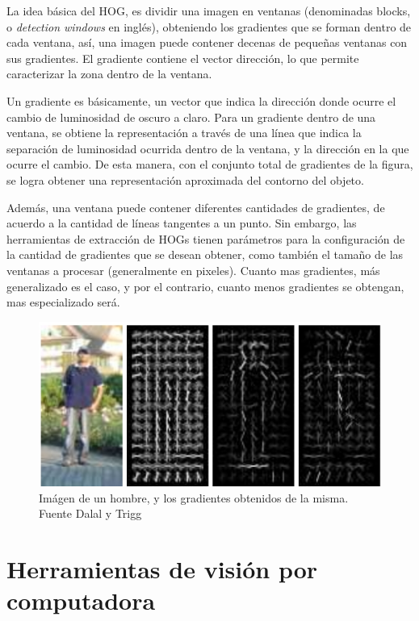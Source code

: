 \documentclass[a4paper,12pt,oneside,spanish]{book}
\begin{document}
La idea básica del HOG, es dividir una imagen en ventanas (denominadas blocks, o \textit{detection windows} en inglés), obteniendo los gradientes que se forman dentro de cada ventana, así, una imagen puede contener decenas de pequeñas ventanas con sus gradientes. El gradiente contiene el vector dirección, lo que permite caracterizar la zona dentro de la ventana.\par

Un gradiente es básicamente, un vector que indica la dirección donde ocurre el cambio de luminosidad de oscuro a claro. Para un gradiente dentro de una ventana, se obtiene la representación a través de una línea que indica la separación de luminosidad ocurrida dentro de la ventana, y la dirección en la que ocurre el cambio. De esta manera, con el conjunto total de gradientes de la figura, se logra obtener una representación aproximada del contorno del objeto.\par

Además, una ventana puede contener diferentes cantidades de gradientes, de acuerdo a la cantidad de líneas tangentes a un punto. Sin embargo, las herramientas de extracción de HOGs tienen parámetros para la configuración de la cantidad de gradientes que se desean obtener, como también el tamaño de las ventanas a procesar (generalmente en pixeles). Cuanto mas gradientes, más generalizado es el caso, y por el contrario, cuanto menos gradientes se obtengan, mas especializado será.\par

\begin{figure}[h!]
	\includegraphics[width=340pt]{Imagenes/hog1.jpg}
	\centering
	\caption{Imágen de un hombre, y los gradientes obtenidos de la misma. Fuente Dalal y Trigg \cite{hog1} }
	\label{fig:hog1}
\end{figure}
 

\section{Herramientas de visión por computadora}
\end{document}
